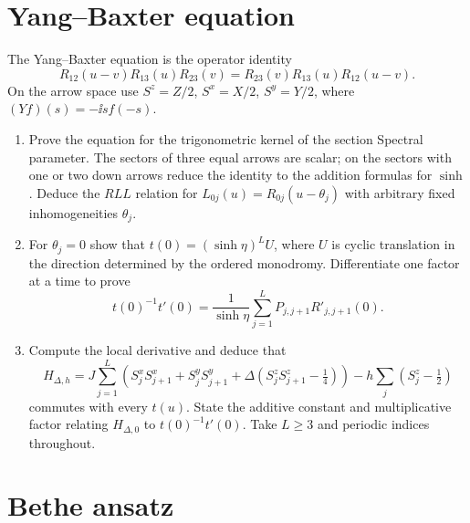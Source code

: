 \section{Yang--Baxter equation}

\begin{exercise}
The Yang--Baxter equation is the operator identity
\[
 R_{12}(u-v)R_{13}(u)R_{23}(v)
 =R_{23}(v)R_{13}(u)R_{12}(u-v).
\]
On the arrow space use $S^z=Z/2$, $S^x=X/2$,
$S^y=Y/2$, where $(Yf)(s)=-\ii s f(-s)$.
\begin{enumerate}[label=(\alph*)]
\item Prove the equation for the trigonometric kernel of the section
Spectral parameter. The sectors of three equal arrows are scalar;
on the sectors with one or two down arrows reduce the identity to
the addition formulas for $\sinh$. Deduce the $RLL$ relation for
$L_{0j}(u)=R_{0j}(u-\theta_j)$ with arbitrary fixed inhomogeneities
$\theta_j$.
\item For $\theta_j=0$ show that $t(0)=(\sinh\eta)^L U$,
where $U$ is cyclic translation in the direction determined by the
ordered monodromy. Differentiate one factor at a time to prove
\[
 t(0)^{-1}t'(0)=
 \frac1{\sinh\eta}\sum_{j=1}^L P_{j,j+1}R'_{j,j+1}(0).
\]
\item Compute the local derivative and deduce that
\[
 H_{\Delta,h}=J\sum_{j=1}^L
 \left(S^x_jS^x_{j+1}+S^y_jS^y_{j+1}
       +\Delta(S^z_jS^z_{j+1}-\tfrac14)\right)
       -h\sum_j(S^z_j-\tfrac12)
\]
commutes with every $t(u)$. State the additive constant and
multiplicative factor relating $H_{\Delta,0}$ to $t(0)^{-1}t'(0)$.
Take $L\ge3$ and periodic indices throughout.
\end{enumerate}
\end{exercise}

\section{Bethe ansatz}

